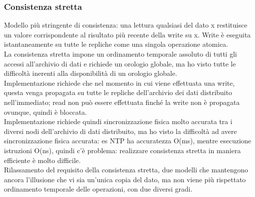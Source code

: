 \documentclass[16px]{article}
\begin{document}
\subsubsection{Consistenza stretta}
Modello più stringente di consistenza: una lettura qualsiasi del dato x restituisce un valore corrispondente al risultato più recente della write su x. Write è eseguita istantaneamente su tutte le repliche come una singola operazione atomica. \\ La consistenza stretta impone un ordinamento temporale assoluto di tutti gli accessi all'archivio di dati e richiede un orologio globale, ma ho visto tutte le difficoltà inerenti alla disponibilità di un orologio globale.\\ Implementazione richiede che nel momento in cui viene effettuata una write, questa venga propagata su tutte le repliche dell'archivio dei dati distribuito nell'immediato; read non può essere effettuata finché la write non è propagata ovunque, quindi è bloccata.\\ Implementazione richiede quindi sincronizzazione fisica molto accurata tra i diversi nodi dell'archivio di dati distribuito, ma ho visto la difficoltà ad avere sincronizzazione fisica accurata: es NTP ha accuratezza O(ms), mentre esecuzione istruzioni O(ns), quindi c'è problema: realizzare consistenza stretta in maniera efficiente è molto difficile. \\ Rilassamento del requisito della consistenza stretta, due modelli che mantengono ancora l'illusione che vi sia un'unica copia del dato, ma non viene più rispettato ordinamento temporale delle operazioni, con due diversi gradi.
\end{document}
